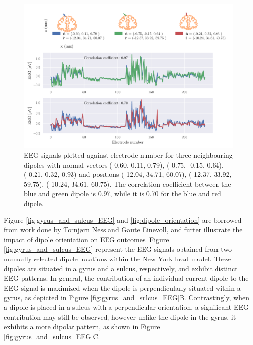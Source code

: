 \documentclass[a4paper, UKenglish, 11pt]{uiomaster}
\begin{document}
\begin{figure}[!htb]
    \centering
    \includegraphics[width=\linewidth]{figures/compare_dipoles.pdf}
    \caption{EEG signals plotted against electrode number for three neighbouring dipoles with normal vectors (-0.60, 0.11, 0.79), (-0.75, -0.15, 0.64), (-0.21, 0.32, 0.93) and positions (-12.04, 34.71, 60.07), (-12.37, 33.92, 59.75), (-10.24, 34.61, 60.75). The correlation coefficient between the blue and green dipole is 0.97, while it is 0.70 for the blue and red dipole. }
    \label{fig:neighbour_dipoles}
\end{figure}

Figure \ref{fig:gyrus_and_sulcus_EEG} and \ref{fig:dipole_orientation} are borrowed from work done by Tornjørn Ness and Gaute Einevoll, and furter illustrate the impact of dipole orientation on EEG outcomes. Figure \ref{fig:gyrus_and_sulcus_EEG} represent the EEG signals obtained from two manually selected dipole locations within the New York head model. These dipoles are situated in a gyrus and a sulcus, respectively, and exhibit distinct EEG patterns. In general, the contribution of an individual current dipole to the EEG signal is maximized when the dipole is perpendicularly situated within a gyrus, as depicted in Figure \ref{fig:gyrus_and_sulcus_EEG}B. Contrastingly, when a dipole is placed in a sulcus with a perpendicular orientation, a significant EEG contribution may still be observed, however unlike the dipole in the gyrus, it exhibits a more dipolar pattern, as shown in Figure \ref{fig:gyrus_and_sulcus_EEG}C.
\end{document}
